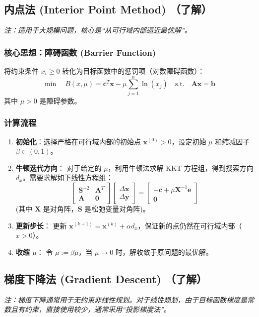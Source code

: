 \documentclass[a4paper,12pt]{ctexart} %
\begin{document}
	\subsection{内点法 (Interior Point Method) （了解）}
	\textit{注：适用于大规模问题，核心是“从可行域内部逼近最优解”。}
	
	\subsubsection*{核心思想：障碍函数 (Barrier Function)}
	将约束条件 $x_i \geq 0$ 转化为目标函数中的惩罚项（对数障碍函数）：
	$$ \min \quad B(x, \mu) = \bm{c}^T \bm{x} - \mu \sum_{j=1}^{n} \ln(x_j) \quad \text{s.t.} \quad \bm{A}\bm{x} = \bm{b} $$
	其中 $\mu > 0$ 是障碍参数。
	
	\subsubsection*{计算流程}
	\begin{enumerate}
		\item \textbf{初始化}：选择严格在可行域内部的初始点 $\bm{x}^{(0)} > 0$，设定初始 $\mu$ 和缩减因子 $\beta \in (0, 1)$。
		\item \textbf{牛顿迭代方向}：
		对于给定的 $\mu$，利用牛顿法求解 KKT 方程组，得到搜索方向 $d_x$。需要求解如下线性方程组：
		$$
		\begin{bmatrix}
			\bm{S}^{-2} & \bm{A}^T \\
			\bm{A} & \bm{0}
		\end{bmatrix}
		\begin{bmatrix}
			\Delta \bm{x} \\
			\Delta \bm{y}
		\end{bmatrix}
		=
		\begin{bmatrix}
			-\bm{c} + \mu \bm{X}^{-1} \bm{e} \\
			\bm{0}
		\end{bmatrix}
		$$
		(其中 $\bm{X}$ 是对角阵，$\bm{S}$ 是松弛变量对角阵)。
		\item \textbf{更新步长}：
		更新 $\bm{x}^{(k+1)} = \bm{x}^{(k)} + \alpha d_x$，保证新的点仍然在可行域内部（$x > 0$）。
		\item \textbf{收缩 $\mu$}：
		令 $\mu := \beta \mu$，当 $\mu \to 0$ 时，解收敛于原问题的最优解。
	\end{enumerate}
	
	\subsection{梯度下降法 (Gradient Descent) （了解）}
	\textit{注：梯度下降通常用于无约束非线性规划。对于线性规划，由于目标函数梯度是常数且有约束，直接使用较少，通常采用“投影梯度法”。}
	
\end{document}
